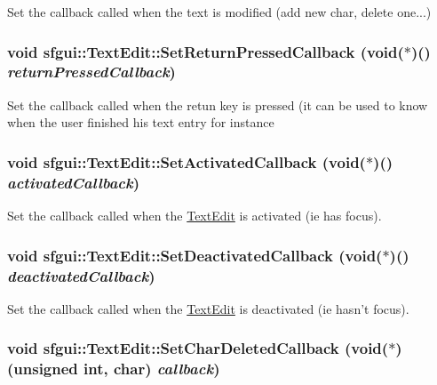 Set the callback called when the text is modified (add new char, delete one...) \hypertarget{classsfgui_1_1TextEdit_b60f88cc667196bb073091e8878483f4}{
\subsubsection[SetReturnPressedCallback]{\setlength{\rightskip}{0pt plus 5cm}void sfgui::TextEdit::SetReturnPressedCallback (void($\ast$)() {\em returnPressedCallback})}}
\label{classsfgui_1_1TextEdit_b60f88cc667196bb073091e8878483f4}




Set the callback called when the retun key is pressed (it can be used to know when the user finished his text entry for instance \hypertarget{classsfgui_1_1TextEdit_68bda298b3563eb960e77c3712664db8}{
\subsubsection[SetActivatedCallback]{\setlength{\rightskip}{0pt plus 5cm}void sfgui::TextEdit::SetActivatedCallback (void($\ast$)() {\em activatedCallback})}}
\label{classsfgui_1_1TextEdit_68bda298b3563eb960e77c3712664db8}




Set the callback called when the \hyperlink{classsfgui_1_1TextEdit}{TextEdit} is activated (ie has focus). \hypertarget{classsfgui_1_1TextEdit_6d75bcac8949d08513caa72e898e9b43}{
\subsubsection[SetDeactivatedCallback]{\setlength{\rightskip}{0pt plus 5cm}void sfgui::TextEdit::SetDeactivatedCallback (void($\ast$)() {\em deactivatedCallback})}}
\label{classsfgui_1_1TextEdit_6d75bcac8949d08513caa72e898e9b43}




Set the callback called when the \hyperlink{classsfgui_1_1TextEdit}{TextEdit} is deactivated (ie hasn't focus). \hypertarget{classsfgui_1_1TextEdit_02d743ef07c871b2ce4666083157628c}{
\subsubsection[SetCharDeletedCallback]{\setlength{\rightskip}{0pt plus 5cm}void sfgui::TextEdit::SetCharDeletedCallback (void($\ast$)(unsigned int, char) {\em callback})}}
\label{classsfgui_1_1TextEdit_02d743ef07c871b2ce4666083157628c}




